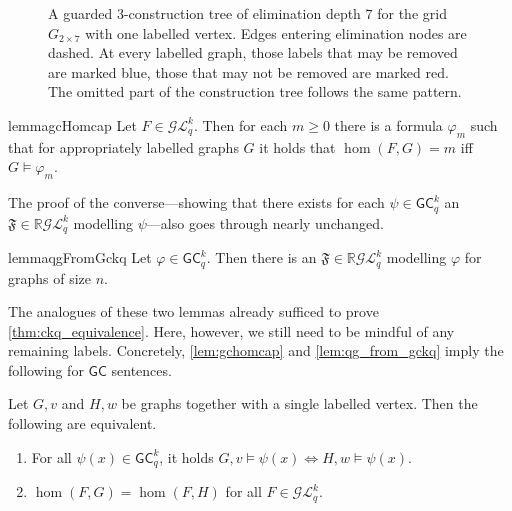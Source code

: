 \documentclass[a4paper,UKenglish,cleveref, autoref, thm-restate]{lipics-v2021}
\newcommand{\R}{\ensuremath{\mathbb{R}}}
\newcommand{\Lkq}{\ensuremath{\mathcal{L}_{q}^{k}}}
\newcommand{\GEkq}{\ensuremath{\mathcal{G}\Lkq}}
\newcommand{\lGC}{\ensuremath{\mathsf{GC}}}
\newcommand{\qg}[1]{\ensuremath{\mathfrak{#1}}} \newcommand{\qgp}[3]{\ensuremath{\mathfrak{#1}[#3; #2]}}
\newcommand{\grid}[2]{\ensuremath{G_{#1 \times #2}}}
\begin{document}
\begin{figure}
  \caption{A guarded $3$-construction tree of elimination depth $7$ for the grid $\grid{2}{7}$ with one labelled vertex. Edges entering elimination nodes are dashed. At every labelled graph, those labels that may be removed are marked blue, those that may not be removed are marked red. The omitted part of the construction tree follows the same pattern.}
  \label{fig:guard-elim-example}
\end{figure}

 


\begin{restatable}{lemma}{gcHomcap}\label{lem:gchomcap}
  Let $F \in \GEkq$. Then for each $m \geq 0$ there is a formula $\varphi_m$ such that for appropriately labelled graphs $G$ it holds that $\hom(F, G) = m$ iff $G \models \varphi_m$.
\end{restatable}

  The proof of the converse---showing that there exists for each $\psi \in \lGC^k_q$ an $\qg{F} \in \R\GEkq$ modelling $\psi$---also goes through nearly unchanged.

\begin{restatable}{lemma}{qgFromGckq}\label{lem:qg_from_gckq}
  Let $\varphi \in \lGC^k_q$. Then there is an $\qg{F} \in \R\GEkq$ modelling $\varphi$ for graphs of size $n$.
\end{restatable}

The analogues of these two lemmas already sufficed to prove \cref{thm:ckq_equivalence}. Here, however, we still need to be mindful of any remaining labels. Concretely, \cref{lem:gchomcap} and \cref{lem:qg_from_gckq} imply the following for $\lGC$ sentences.

\begin{corollary}\label{cor:gc-thm-with-labels}
  Let $G, v$ and $H, w$ be graphs together with a single labelled vertex. Then the following are equivalent.
  \begin{enumerate}
    \item For all $\psi(x) \in \lGC^k_q$, it holds $G, v \models \psi(x) \iff H, w \models \psi(x)$.
    \item $\hom(F, G) = \hom(F, H)$ for all $F \in \GEkq$.
  \end{enumerate}
\end{corollary}
\end{document}
